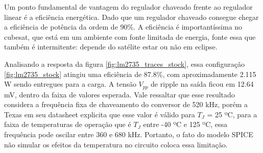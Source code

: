 \noindent
\begin{minipage}{\linewidth}
\label{fig:lm2735_traces_stock}
\end{minipage}

Um ponto fundamental de vantagem do regulador chaveado frente ao regulador linear é a eficiência energética. Dado que um regulador chaveado consegue chegar a eficiência de potência da ordem de 90\%. A eficiência é importantíssima no cubesat, que está em um ambiente com fonte limitada de energia, fonte essa que também é intermitente: depende do satélite estar ou não em eclipse.

Analisando a resposta da figura \ref{fig:lm2735_traces_stock}, essa configuração \ref{fig:lm2735_stock} atingiu uma eficiência de 87.8\%, com aproximadamente 2.115 W sendo entregues para a carga.
A tensão $V_{pp}$ de ripple na saída ficou em 12.64 mV, dentro da faixa de valores esperada. Vale ressaltar que esse resultado considera a frequência fixa de chaveamento do conversor de 520 kHz, porém a Texas em seu datasheet explicita que esse valor é válido para $T_{J}$ = 25 ºC, para a faixa de temperaturas de operação que é $T_{J}$ entre -40 ºC e 125 ºC, essa frequência pode oscilar entre 360 e 680 kHz. Portanto, o fato do modelo SPICE não simular os efeitos da temperatura no circuito coloca essa limitação.

